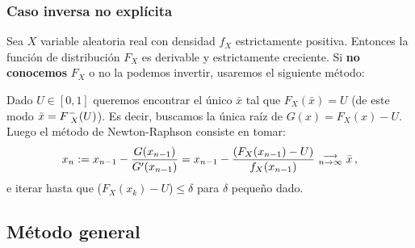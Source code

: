 \subsubsection{Caso inversa no explícita}
Sea $X$ variable aleatoria real con densidad $f_X$ estrictamente positiva. Entonces la función de distribución $F_X$ es derivable y estrictamente creciente. Si \textbf{no conocemos} $F_X$ %
o no la podemos invertir, usaremos el siguiente método:
\begin{definition}
Dado $U\in[0,1]$ queremos encontrar el único $\bar{x}$ tal que $F_X(\bar{x})=U$ (de este modo $\bar{x}=F^-_{\mbox{ }X}(U)$). Es decir, buscamos la única raíz de $G(x)=F_X(x)-U$.
\newline Luego el método de Newton-Raphson consiste en tomar:
$$ x_n:=x_{n-1}-\displaystyle\frac{G(x_{n-1})}{G'(x_{n-1})}=x_{n-1}-\frac{(F_X(x_{n-1})-U)}{f_X(x_{n-1})}\mbox{ }\substack{\longrightarrow \\ n\to\infty}\mbox{ } \bar{x} \, ,$$
e iterar hasta que ($F_X(x_k)-U$)$\leq\delta$ para $\delta$ pequeño dado.
\end{definition}

\subsection{Método general}
